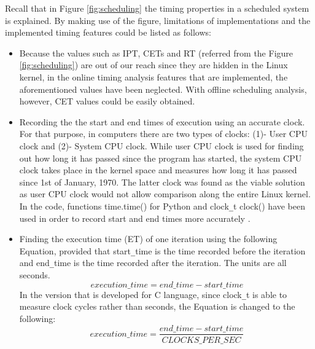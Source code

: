 Recall that in Figure \ref{fig:scheduling} the timing properties in a scheduled system is explained. By making use of the figure, limitations of implementations and the implemented timing features could be listed as follows:
\begin{itemize}
	\item Because the values such as IPT, CETs and RT (referred from the Figure \ref{fig:scheduling}) are out of our reach since they are hidden in the Linux kernel, in the online timing analysis features that are implemented, the aforementioned values have been neglected. With offline scheduling analysis, however, CET values could be easily obtained.
	\item Recording the the start and end times of execution using an accurate clock. For that purpose, in computers there are two types of clocks: (1)- User CPU clock and (2)- System CPU clock. While user CPU clock is used for finding out how long it has passed since the program has started, the system CPU clock takes place in the kernel space and measures how long it has passed since 1st of January, 1970. The latter clock was found as the viable solution as user CPU clock would not allow comparison along the entire Linux kernel. In the code, functions time.time() for Python and clock\texttt{\_}t clock() have been used in order to record start and end times more accurately \cite{cpuandusertimes} \cite{cpuandusertimes2}.
	\item Finding the execution time (ET) of one iteration using the following Equation, provided that start\texttt{\_}time is the time recorded before the iteration and end\texttt{\_}time is the time recorded after the iteration. The units are all seconds.
	\begin{equation}
	execution\texttt{\_}time=end\texttt{\_}time - start\texttt{\_}time
	\end{equation}
	In the version that is developed for C language, since clock\texttt{\_}t is able to measure clock cycles rather than seconds, the Equation is changed to the following:
	\begin{equation}
	execution\texttt{\_}time=\frac{end\texttt{\_}time - start\texttt{\_}time} {CLOCKS\texttt{\_}PER\texttt{\_}SEC}
	\end{equation}
	

\end{itemize}
